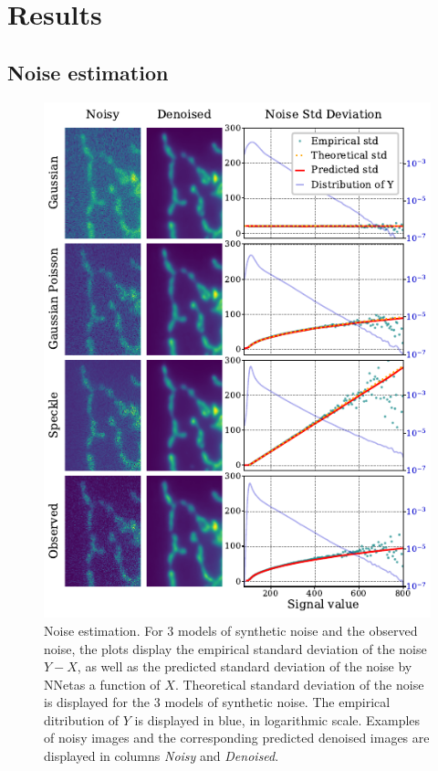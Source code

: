 \documentclass{article}
\begin{document}
\section{Results}
\subsection{Noise estimation}

\begin{figure}[ht]
\vskip 0.2in
\begin{center}
\centerline{\includegraphics[width=\columnwidth]{fig_noise_std.pdf}}
\caption{Noise estimation.
For 3 models of synthetic noise and the observed noise, the plots display the empirical standard deviation of the noise $Y - X$, as well as the predicted standard deviation of the noise by NNet\footnotemark as a function of $X$.
Theoretical standard deviation of the noise is displayed for the 3 models of synthetic noise.
The empirical ditribution of $Y$ is displayed in blue, in logarithmic scale.
Examples of noisy images and the corresponding predicted denoised images are displayed in columns \textit{Noisy} and \textit{Denoised}.}
\label{fig:noisestd}
\end{center}
\vskip -0.2in
\end{figure}
\end{document}
